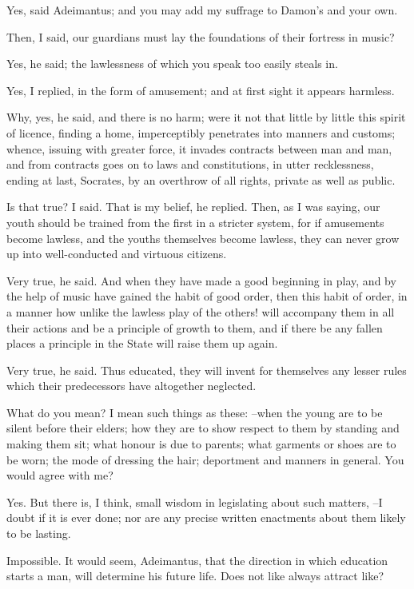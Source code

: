 Yes, said Adeimantus; and you may add my suffrage to Damon's and your own.

Then, I said, our guardians must lay the foundations of their fortress in music?

Yes, he said; the lawlessness of which you speak too easily steals in.

Yes, I replied, in the form of amusement; and at first sight it appears harmless.

Why, yes, he said, and there is no harm; were it not that little by little this spirit of licence, finding a home, imperceptibly penetrates into manners and customs; whence, issuing with greater force, it invades contracts between man and man, and from contracts goes on to laws and constitutions, in utter recklessness, ending at last, Socrates, by an overthrow of all rights, private as well as public.

Is that true? I said.
That is my belief, he replied.
Then, as I was saying, our youth should be trained from the first in a stricter system, for if amusements become lawless, and the youths themselves become lawless, they can never grow up into well-conducted and virtuous citizens.

Very true, he said.
And when they have made a good beginning in play, and by the help of music have gained the habit of good order, then this habit of order, in a manner how unlike the lawless play of the others! will accompany them in all their actions and be a principle of growth to them, and if there be any fallen places a principle in the State will raise them up again.

Very true, he said.
Thus educated, they will invent for themselves any lesser rules which their predecessors have altogether neglected.

What do you mean?
I mean such things as these: --when the young are to be silent before their elders; how they are to show respect to them by standing and making them sit; what honour is due to parents; what garments or shoes are to be worn; the mode of dressing the hair; deportment and manners in general. You would agree with me?

Yes.
But there is, I think, small wisdom in legislating about such matters, --I doubt if it is ever done; nor are any precise written enactments about them likely to be lasting.

Impossible.
It would seem, Adeimantus, that the direction in which education starts a man, will determine his future life. Does not like always attract like?

